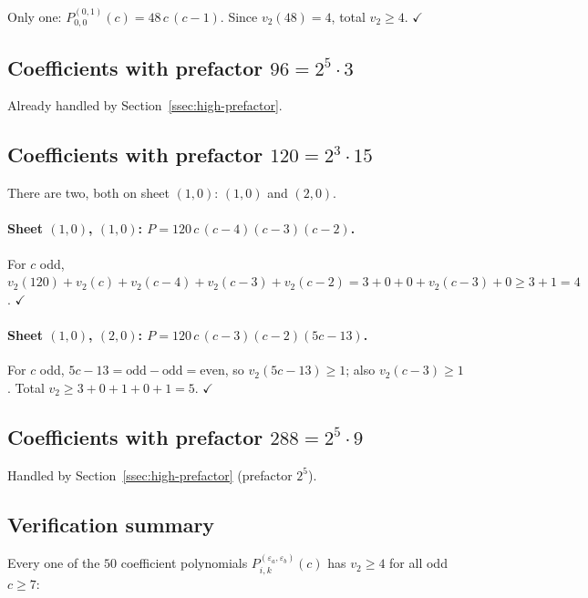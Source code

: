 \documentclass[11pt]{article}
\begin{document}
Only one: $P^{(0,1)}_{0,0}(c) = 48\, c\, (c-1)$. Since $v_2(48) = 4$, total
$v_2 \ge 4$. $\checkmark$

\subsection{Coefficients with prefactor $96 = 2^5 \cdot 3$}\label{ssec:96}

Already handled by Section~\ref{ssec:high-prefactor}.

\subsection{Coefficients with prefactor $120 = 2^3 \cdot 15$}\label{ssec:120}

There are two, both on sheet $(1,0)$: $(1,0)$ and $(2,0)$.

\paragraph{Sheet $(1,0)$, $(1,0)$: $P = 120\, c\, (c-4)(c-3)(c-2)$.}
For $c$ odd, $v_2(120) + v_2(c) + v_2(c-4) + v_2(c-3) + v_2(c-2) =
3 + 0 + 0 + v_2(c-3) + 0 \ge 3 + 1 = 4$. $\checkmark$

\paragraph{Sheet $(1,0)$, $(2,0)$: $P = 120\, c\, (c-3)(c-2)(5c-13)$.}
For $c$ odd, $5c - 13 = \text{odd} - \text{odd} = \text{even}$, so $v_2(5c-13) \ge 1$;
also $v_2(c-3) \ge 1$. Total $v_2 \ge 3 + 0 + 1 + 0 + 1 = 5$. $\checkmark$

\subsection{Coefficients with prefactor $288 = 2^5 \cdot 9$}\label{ssec:288}

Handled by Section~\ref{ssec:high-prefactor} (prefactor $2^5$).

\subsection{Verification summary}

Every one of the $50$ coefficient polynomials
$P^{(\varepsilon_a, \varepsilon_b)}_{i,k}(c)$ has $v_2 \ge 4$ for all odd
$c \ge 7$:
\end{document}
